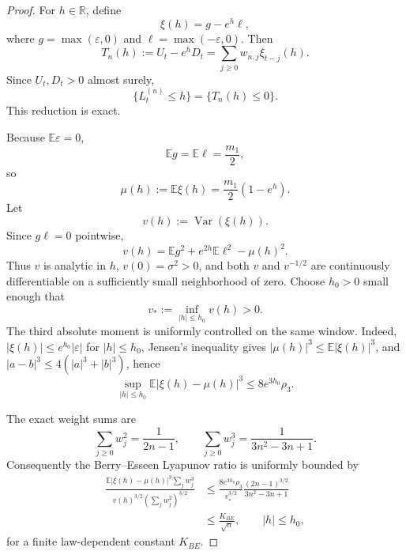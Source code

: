 \documentclass[11pt]{article}
\newcommand{\E}{\mathbb E}
\newcommand{\Var}{\operatorname{Var}}
\begin{document}
\begin{proof}
For $h\in\mathbb R$, define
\begin{equation}
\xi(h)=g-e^h\ell,
\end{equation}
where $g=\max(\varepsilon,0)$ and $\ell=\max(-\varepsilon,0)$. Then
\begin{equation}
T_n(h):=U_t-e^hD_t=\sum_{j\ge0}w_{n,j}\xi_{t-j}(h).
\end{equation}
Since $U_t,D_t>0$ almost surely,
\begin{equation}
\boxed{\{L_t^{(n)}\le h\}=\{T_n(h)\le0\}.}
\end{equation}
This reduction is exact.

Because $\E\varepsilon=0$,
\begin{equation}
\E g=\E\ell=\frac{m_1}{2},
\end{equation}
so
\begin{equation}
\mu(h):=\E\xi(h)=\frac{m_1}{2}(1-e^h).
\end{equation}
Let
\begin{equation}
v(h):=\Var(\xi(h)).
\end{equation}
Since $g\ell=0$ pointwise,
\begin{equation}
v(h)=\E g^2+e^{2h}\E\ell^2-\mu(h)^2.
\end{equation}
Thus $v$ is analytic in $h$, $v(0)=\sigma^2>0$, and both $v$ and
$v^{-1/2}$ are continuously differentiable on a sufficiently small
neighborhood of zero. Choose $h_0>0$ small enough that
\begin{equation}
 v_*:=\inf_{|h|\le h_0}v(h)>0.
\end{equation}
The third absolute moment is uniformly controlled on the same window. Indeed,
$|\xi(h)|\le e^{h_0}|\varepsilon|$ for $|h|\le h_0$, Jensen's inequality gives
$|\mu(h)|^3\le \E|\xi(h)|^3$, and $|a-b|^3\le4(|a|^3+|b|^3)$, hence
\begin{equation}
\boxed{
\sup_{|h|\le h_0}\E|\xi(h)-\mu(h)|^3
\le 8e^{3h_0}\rho_3.}
\end{equation}

The exact weight sums are
\begin{equation}
\sum_{j\ge0}w_j^2=\frac1{2n-1},
\qquad
\sum_{j\ge0}w_j^3=\frac1{3n^2-3n+1}.
\end{equation}
Consequently the Berry--Esseen Lyapunov ratio is uniformly bounded by
\begin{align}
\frac{\E|\xi(h)-\mu(h)|^3\sum_jw_j^3}
{v(h)^{3/2}(\sum_jw_j^2)^{3/2}}
&\le
\frac{8e^{3h_0}\rho_3}{v_*^{3/2}}
\frac{(2n-1)^{3/2}}{3n^2-3n+1}\\
&\le \frac{K_{BE}}{\sqrt n},
\qquad |h|\le h_0,
\end{align}
for a finite law-dependent constant $K_{BE}$.


\end{proof}
\end{document}

